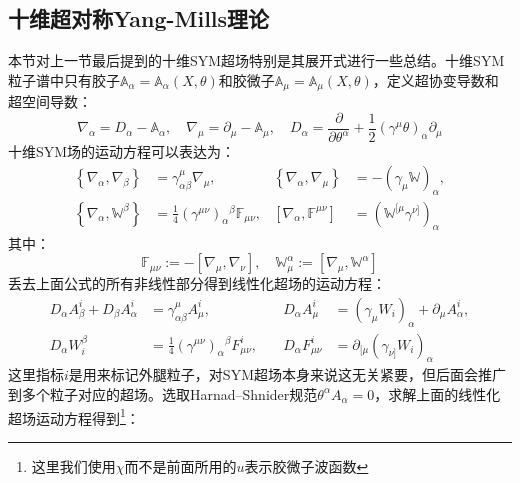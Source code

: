 \subsection{十维超对称Yang-Mills理论}
本节对上一节最后提到的十维SYM超场特别是其展开式进行一些总结。十维SYM粒子谱中只有胶子$\mathbb{A}_\alpha=\mathbb{A}_\alpha(X,\theta)$和胶微子$\mathbb{A}_\mu=\mathbb{A}_\mu(X,\theta)$，定义超协变导数和超空间导数：
\begin{equation}
	\nabla_\alpha = D_\alpha - \mathbb{A}_\alpha, \quad
	\nabla_\mu = \partial_\mu - \mathbb{A}_\mu, \quad
	D_\alpha = \frac{\partial}{\partial\theta^\alpha} + \frac{1}{2} (\gamma^\mu \theta)_\alpha \partial_\mu
\end{equation}
十维SYM场的运动方程可以表达为：
\begin{equation}
	\label{eq:5.43}
	\begin{aligned}
		\left\{\nabla_\alpha, \nabla_\beta\right\} 
		&= \gamma_{\alpha\beta}^\mu \nabla_\mu, \quad 
		& \left\{\nabla_\alpha, \nabla_\mu\right\} 
		&= -(\gamma_\mu \mathbb{W})_\alpha, \\
		\left\{\nabla_\alpha, \mathbb{W}^\beta\right\} 
		&= \frac{1}{4} (\gamma^{\mu\nu})_\alpha{}^\beta \mathbb{F}_{\mu\nu}, 
		& \left[\nabla_\alpha, \mathbb{F}^{\mu\nu}\right] 
		&= (\mathbb{W}^{[\mu} \gamma^{\nu]})_\alpha
	\end{aligned}
\end{equation}
其中：
\begin{equation}
		\mathbb{F}_{\mu\nu} := -\left[\nabla_\mu, \nabla_\nu\right], \quad \mathbb{W}_\mu^\alpha := \left[\nabla_\mu, \mathbb{W}^\alpha\right]
\end{equation}
丢去上面公式的所有非线性部分得到线性化超场的运动方程：
\begin{equation}
	\label{eq:5.45}
\begin{aligned}
	D_\alpha A_\beta^i + D_\beta A_\alpha^i 
	&= \gamma_{\alpha\beta}^\mu A_\mu^i, \quad 
	& D_\alpha A_\mu^i 
	&= (\gamma_\mu W_i)_\alpha + \partial_\mu A_\alpha^i, \\
	D_\alpha W_i^\beta 
	&= \frac{1}{4} (\gamma^{\mu\nu})_\alpha{}^\beta F_{\mu\nu}^i, \quad 
	& D_\alpha F_{\mu\nu}^i 
	&= \partial_{[\mu} (\gamma_{\nu]} W_i)_\alpha
\end{aligned}
\end{equation}
这里指标$i$是用来标记外腿粒子，对SYM超场本身来说这无关紧要，但后面会推广到多个粒子对应的超场。选取Harnad–Shnider规范$\theta^\alpha A_{\alpha} = 0$，求解上面的线性化超场运动方程得到\footnote{这里我们使用$\chi$而不是前面所用的$u$表示胶微子波函数}：\cite{Policastro:2006vt}
